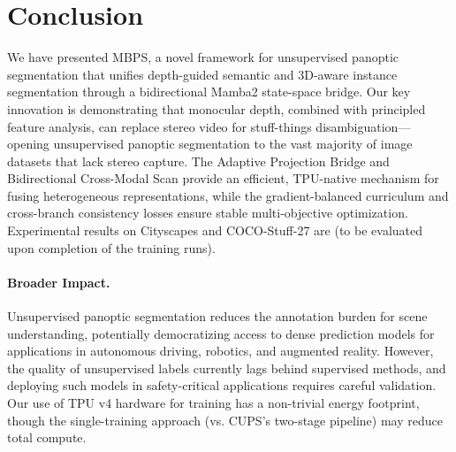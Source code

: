 \documentclass{article}
\begin{document}
\section{Conclusion}
\label{sec:conclusion}

We have presented MBPS, a novel framework for unsupervised panoptic segmentation that unifies depth-guided semantic and 3D-aware instance segmentation through a bidirectional Mamba2 state-space bridge. Our key innovation is demonstrating that monocular depth, combined with principled feature analysis, can replace stereo video for stuff-things disambiguation---opening unsupervised panoptic segmentation to the vast majority of image datasets that lack stereo capture. The Adaptive Projection Bridge and Bidirectional Cross-Modal Scan provide an efficient, TPU-native mechanism for fusing heterogeneous representations, while the gradient-balanced curriculum and cross-branch consistency losses ensure stable multi-objective optimization. Experimental results on Cityscapes and COCO-Stuff-27 are \underline{\hspace{3em}} (to be evaluated upon completion of the training runs).

\paragraph{Broader Impact.}
Unsupervised panoptic segmentation reduces the annotation burden for scene understanding, potentially democratizing access to dense prediction models for applications in autonomous driving, robotics, and augmented reality. However, the quality of unsupervised labels currently lags behind supervised methods, and deploying such models in safety-critical applications requires careful validation. Our use of TPU v4 hardware for training has a non-trivial energy footprint, though the single-training approach (vs. CUPS's two-stage pipeline) may reduce total compute.




\end{document}
